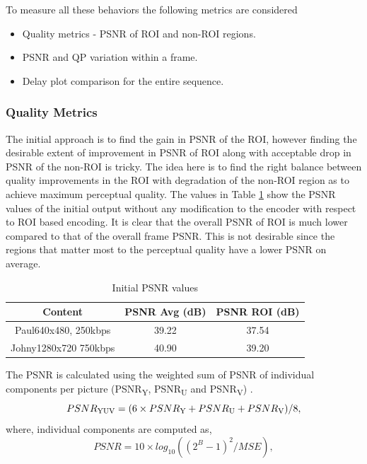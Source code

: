 \documentclass[11pt]{article} %
\begin{document}
To measure all these behaviors the following metrics are considered
\begin{itemize}  
\item Quality metrics - PSNR of ROI and non-ROI regions.
\item PSNR and QP variation within a frame.
\item Delay plot comparison for the entire sequence.
\end{itemize}
\subsubsection{Quality Metrics} \label{sec:setup-PSNR}
The initial approach is to find the gain in PSNR of the ROI, however finding the desirable extent of improvement in PSNR of ROI along with acceptable drop in PSNR of the non-ROI is tricky. The idea here is to find the right balance between quality improvements in the ROI with degradation of the non-ROI region as to achieve maximum perceptual quality. The values in Table \ref{InitPSNR1} show the PSNR values of the initial output without any modification to the encoder with respect to ROI based encoding. It is clear that the overall PSNR of ROI is much lower compared to that of the overall frame PSNR. This is not desirable since the regions that matter most to the perceptual quality have a lower PSNR on average.

\begin{table} [h!]
\centering
\begin{tabular}{ |c|c|c| }
 \hline
Content & PSNR Avg (dB) & PSNR ROI (dB) \\
 \hline 
 Paul640x480, 250kbps & 39.22 & 37.54 \\ 
 Johny1280x720 750kbps & 40.90 & 39.20 \\  
 \hline
\end{tabular}
 \caption{Initial PSNR values}
 \label{InitPSNR1}
\end{table}

The PSNR is calculated using the weighted sum of PSNR of individual components per picture (PSNR\textsubscript{Y}, PSNR\textsubscript{U} and PSNR\textsubscript{V}) \cite{ComparingCodingEfficiency}.
\begin{equation}
\label{Eq:PSNR}
PSNR\textsubscript{YUV} = ( 6 \times PSNR\textsubscript{Y} + PSNR\textsubscript{U} + PSNR\textsubscript{V}) / 8,
\end{equation}
 where, individual components are computed as,
\begin{equation}
\label{Eq:PSNRDef}
PSNR = 10 \times log_{10}((2^B - 1)^2 / MSE),
\end{equation}
\end{document}
